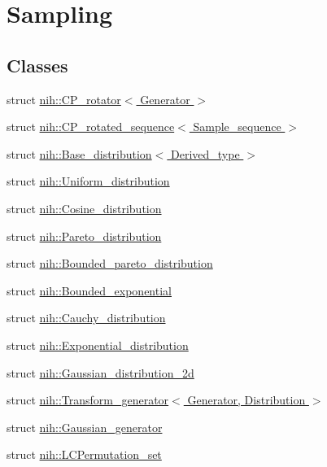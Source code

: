 \hypertarget{group__sampling}{
\section{\-Sampling}
\label{group__sampling}
}
\subsection*{\-Classes}
\begin{DoxyCompactItemize}
\item 
struct \hyperlink{structnih_1_1_c_p__rotator}{nih\-::\-C\-P\-\_\-rotator$<$ Generator $>$}
\item 
struct \hyperlink{structnih_1_1_c_p__rotated__sequence}{nih\-::\-C\-P\-\_\-rotated\-\_\-sequence$<$ Sample\-\_\-sequence $>$}
\item 
struct \hyperlink{structnih_1_1_base__distribution}{nih\-::\-Base\-\_\-distribution$<$ Derived\-\_\-type $>$}
\item 
struct \hyperlink{structnih_1_1_uniform__distribution}{nih\-::\-Uniform\-\_\-distribution}
\item 
struct \hyperlink{structnih_1_1_cosine__distribution}{nih\-::\-Cosine\-\_\-distribution}
\item 
struct \hyperlink{structnih_1_1_pareto__distribution}{nih\-::\-Pareto\-\_\-distribution}
\item 
struct \hyperlink{structnih_1_1_bounded__pareto__distribution}{nih\-::\-Bounded\-\_\-pareto\-\_\-distribution}
\item 
struct \hyperlink{structnih_1_1_bounded__exponential}{nih\-::\-Bounded\-\_\-exponential}
\item 
struct \hyperlink{structnih_1_1_cauchy__distribution}{nih\-::\-Cauchy\-\_\-distribution}
\item 
struct \hyperlink{structnih_1_1_exponential__distribution}{nih\-::\-Exponential\-\_\-distribution}
\item 
struct \hyperlink{structnih_1_1_gaussian__distribution__2d}{nih\-::\-Gaussian\-\_\-distribution\-\_\-2d}
\item 
struct \hyperlink{structnih_1_1_transform__generator}{nih\-::\-Transform\-\_\-generator$<$ Generator, Distribution $>$}
\item 
struct \hyperlink{structnih_1_1_gaussian__generator}{nih\-::\-Gaussian\-\_\-generator}
\item 
struct \hyperlink{structnih_1_1_l_c_permutation__set}{nih\-::\-L\-C\-Permutation\-\_\-set}
\item 

\end{DoxyCompactItemize}
